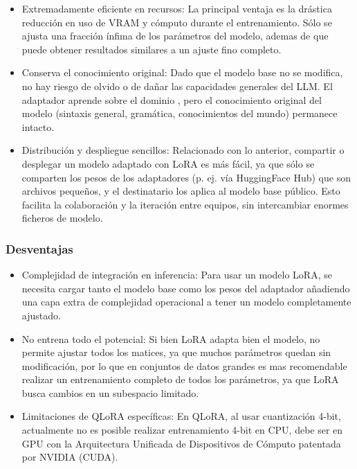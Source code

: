 \begin{itemize}

    \item Extremadamente eficiente en recursos: La principal ventaja es la drástica reducción en uso de VRAM y cómputo durante el entrenamiento. Sólo se ajusta una fracción ínfima de los parámetros del modelo, ademas de que puede obtener resultados similares a un ajuste fino completo.

    \item Conserva el conocimiento original: Dado que el modelo base no se modifica, no hay riesgo de olvido o de dañar las capacidades generales del LLM. El adaptador aprende sobre el dominio , pero el conocimiento original del modelo (sintaxis general, gramática, conocimientos del mundo) permanece intacto. 

    \item Distribución y despliegue sencillos: Relacionado con lo anterior, compartir o desplegar un modelo adaptado con LoRA es más fácil, ya que sólo se comparten los pesos de los adaptadores (p. ej. vía HuggingFace Hub) que son archivos pequeños, y el destinatario los aplica al modelo base público. Esto facilita la colaboración y la iteración entre equipos, sin intercambiar enormes ficheros de modelo.
\end{itemize}

\subsubsection{Desventajas}

\begin{itemize}
    \item Complejidad de integración en inferencia: Para usar un modelo LoRA, se necesita cargar tanto el modelo base como los pesos del adaptador añadiendo una capa extra de complejidad operacional a tener un modelo completamente ajustado.

    \item No entrena todo el potencial: Si bien LoRA adapta bien el modelo, no permite ajustar todos los matices, ya que muchos parámetros quedan sin modificación, por lo que  en conjuntos de datos grandes es mas recomendable realizar un entrenamiento completo de todos los parámetros, ya que LoRA busca cambios en un subespacio limitado.

    \item Limitaciones de QLoRA específicas: En QLoRA, al usar cuantización 4-bit, actualmente no es posible realizar entrenamiento 4-bit en CPU, debe ser en GPU con la Arquitectura Unificada de Dispositivos de Cómputo patentada por NVIDIA (CUDA).
\end{itemize}

